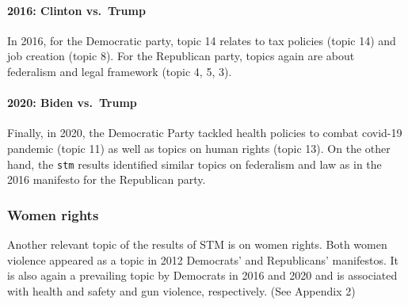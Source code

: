 \documentclass[
]{article}
\begin{document}
\hypertarget{clinton-vs.-trump-1}{%
\paragraph{2016: Clinton vs.~Trump}\label{clinton-vs.-trump-1}}

In 2016, for the Democratic party, topic 14 relates to tax policies
(topic 14) and job creation (topic 8). For the Republican party, topics
again are about federalism and legal framework (topic 4, 5, 3).

\hypertarget{biden-vs.-trump-1}{%
\paragraph{2020: Biden vs.~Trump}\label{biden-vs.-trump-1}}

Finally, in 2020, the Democratic Party tackled health policies to combat
covid-19 pandemic (topic 11) as well as topics on human rights (topic
13). On the other hand, the \texttt{stm} results identified similar
topics on federalism and law as in the 2016 manifesto for the Republican
party.

\hypertarget{women-rights}{%
\subsubsection{Women rights}\label{women-rights}}

Another relevant topic of the results of STM is on women rights. Both
women violence appeared as a topic in 2012 Democrats' and Republicans'
manifestos. It is also again a prevailing topic by Democrats in 2016 and
2020 and is associated with health and safety and gun violence,
respectively. (See Appendix 2)
\end{document}
